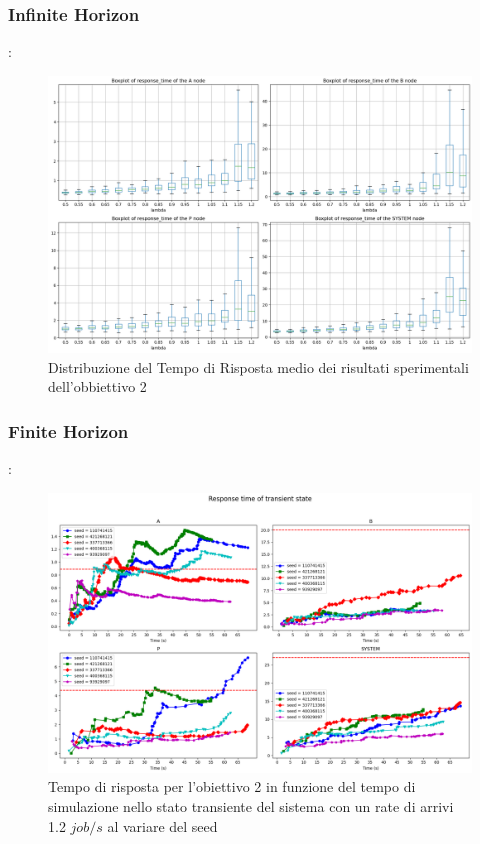 \subsubsection{Infinite Horizon}
\begin{frame}{\subsecname: \subsubsecname}
    \begin{figure}
        \centering
        \includegraphics[width=0.75\linewidth]{figs/results/obj2/simulation/obj2_boxplot_rtime.png}
        \caption{Distribuzione del Tempo di Risposta medio dei risultati sperimentali dell’obbiettivo 2}
        \label{fig:enter-label}
    \end{figure}
\end{frame}

\subsubsection{Finite Horizon}
\begin{frame}{\subsecname: \subsubsecname}
    \begin{figure}
        \centering
        \includegraphics[width=0.75\linewidth]{figs/appendices/transient/obj2-transient-rtime-analitycal.png}
        \caption{Tempo di risposta per l’obiettivo 2 in funzione del tempo di simulazione nello stato transiente del sistema con un rate di arrivi 1.2 $job/s$ al variare del seed}
        \label{fig:enter-label}
    \end{figure}
\end{frame}

